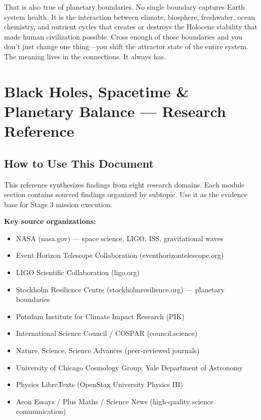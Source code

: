 \documentclass[11pt,letterpaper]{article}
\newcommand{\stageheader}[2]{%
  \noindent\colorbox{#2}{\makebox[\textwidth][l]{%
    \textcolor{white}{\bfseries\sffamily\hspace{6pt}#1\hspace{6pt}}}}%
  \vspace{0.5em}\par%
}
\begin{document}
That is also true of planetary boundaries. No single boundary captures Earth system health. It is the interaction between climate, biosphere, freshwater, ocean chemistry, and nutrient cycles that creates or destroys the Holocene stability that made human civilization possible. Cross enough of those boundaries and you don't just change one thing---you shift the attractor state of the entire system. The meaning lives in the connections. It always has.

\newpage

\stageheader{STAGE 2 --- RESEARCH REFERENCE}{secondary}

\section{Black Holes, Spacetime \& Planetary Balance --- Research Reference}

\subsection{How to Use This Document}

This reference synthesizes findings from eight research domains. Each module section contains sourced findings organized by subtopic. Use it as the evidence base for Stage 3 mission execution.

\textbf{Key source organizations:}
\begin{itemize}[noitemsep]
\item NASA (nasa.gov) --- space science, LIGO, ISS, gravitational waves
\item Event Horizon Telescope Collaboration (eventhorizontelescope.org)
\item LIGO Scientific Collaboration (ligo.org)
\item Stockholm Resilience Centre (stockholmresilience.org) --- planetary boundaries
\item Potsdam Institute for Climate Impact Research (PIK)
\item International Science Council / COSPAR (council.science)
\item Nature, Science, Science Advances (peer-reviewed journals)
\item University of Chicago Cosmology Group; Yale Department of Astronomy
\item Physics LibreTexts (OpenStax University Physics III)
\item Aeon Essays / Plus Maths / Science News (high-quality science communication)
\end{itemize}
\end{document}
